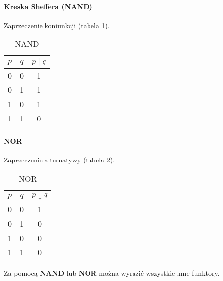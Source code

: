         \paragraph{Kreska Sheffera (NAND)}
        Zaprzeczenie koniunkcji (tabela \ref{tab:nand}).
        \begin{table}[htbp!]
            \centering
            \caption{NAND}
            \label{tab:nand}
            \vspace{3mm}
            \begin{tabular}{ccc}
                \textbf{$p$} & \textbf{$q$} & \textbf{$p \mid q$} \\
                \midrule
                0 & 0 & 1\\
                0 & 1 & 1\\
                1 & 0 & 1\\
                1 & 1 & 0\\
                \bottomrule
            \end{tabular}
        \end{table}
        
        \paragraph{NOR}
        Zaprzeczenie alternatywy (tabela \ref{tab:nor}). 
        \begin{table}[htbp!]
            \centering
                \caption{NOR}
                \label{tab:nor}
                \vspace{3mm}
                \begin{tabular}{ccc}
                    \textbf{$p$} & \textbf{$q$} & \textbf{$p\downarrow q$} \\
                    \midrule
                    0 & 0 & 1\\
                    0 & 1 & 0\\
                    1 & 0 & 0\\
                    1 & 1 & 0\\
                    \bottomrule
                \end{tabular}
        \end{table}
        
        \begin{theorem}
            Za pomocą \textbf{NAND} lub \textbf{NOR} można wyrazić wszystkie inne funktory.
        \end{theorem}
    
